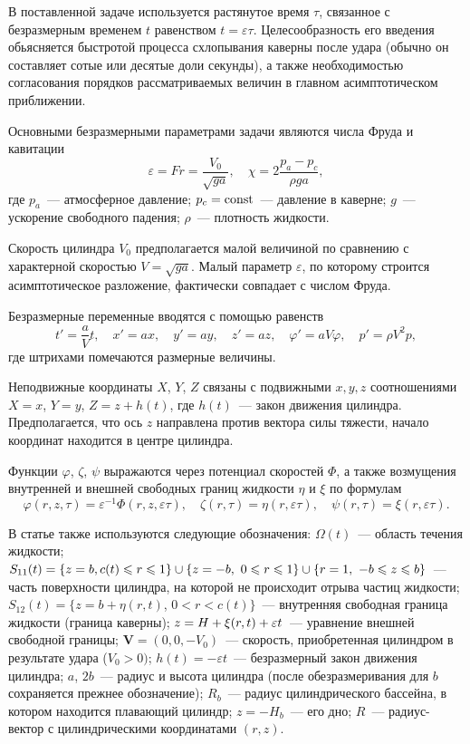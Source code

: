 \documentclass[press]{vestnik}
\begin{document}
В поставленной задаче используется растянутое время $\tau $, связанное с 
безразмерным временем $t$ равенством $t=\varepsilon \tau $. Целесообразность 
его введения обьясняется быстротой процесса схлопывания каверны после удара 
(обычно он составляет сотые или десятые доли секунды), а также 
необходимостью согласования порядков рассматриваемых величин в главном 
асимптотическом приближении. 

Основными безразмерными параметрами задачи являются числа Фруда и 
кавитации
\[
\varepsilon =Fr=\frac{V_{0} }{\sqrt {ga} },
\quad
\chi =2\frac{p_{a} -p_{c} }{\rho ga},
\]
где $p_{a} $~--- атмосферное давление; $p_{c} =\mathrm{const}$~--- давление в 
каверне; $g$~--- ускорение свободного падения; $\rho $~--- плотность жидкости. 

Скорость цилиндра $V_{0} $ предполагается малой величиной по сравнению с 
характерной скоростью $V=\sqrt {ga} $. Малый параметр $\varepsilon $, по 
которому строится асимптотическое разложение, фактически совпадает с числом 
Фруда.

Безразмерные переменные вводятся с помощью равенств
\[
{t}'=\frac{a}{V}t,
\quad
{x}'=ax,
\quad
{y}'=ay,
\quad
{z}'=az,
\quad
{\varphi }'=aV\varphi ,
\quad
{p}'=\rho V^{2}p,
\]
где штрихами помечаются размерные величины.

Неподвижные координаты $X$, $Y$, $Z$ связаны с подвижными $x,y,z$ соотношениями
$X=x$, $Y=y$, $Z=z+h(t)$, где $h(t)$~--- закон движения цилиндра. 
Предполагается, что ось $z$ направлена против вектора силы тяжести, начало 
координат находится в центре цилиндра. 

Функции $\varphi$, $\zeta$, $\psi $ выражаются через потенциал скоростей $\Phi $, а 
также возмущения внутренней и внешней свободных границ жидкости $\eta $ и 
$\xi $ по формулам
\[
\varphi (r,z,\tau )=\varepsilon^{-1}\Phi (r,z,\varepsilon \tau ),
\quad
\zeta (r,\tau )=\eta (r,\varepsilon \tau ),
\quad
\psi (r,\tau )=\xi (r,\varepsilon \tau ).
\]

В статье также используются следующие обозначения: $\Omega (t)$~--- область 
течения жидкости; $S_{11} (t)=\left\{ {z=b,c(t)\leqslant r\leqslant 1} \right\}\cup 
\left\{ {z=-b,\ 0\leqslant r\leqslant 1} \right\}\dm\cup \left\{ {r=1,\ -b\leqslant z\leqslant b} \right\}$~--- часть поверхности цилиндра, на которой не происходит отрыва частиц 
жидкости; $S_{12} (t)=\{ z=b+\eta (r,t)$, $0< r < c(t) \}$~--- 
внутренняя свободная граница жидкости (граница каверны); $z\dm=H+\xi 
(r,t)+\varepsilon t$~--- уравнение внешней свободной границы; $\bm V=(0, 0, -V_{0} )$~--- скорость, приобретенная цилиндром в результате 
удара ($V_{0} >0)$; $h(t)=-\varepsilon t$~--- безразмерный закон движения 
цилиндра; $a$, $2b$~--- радиус и высота цилиндра (после обезразмеривания для 
$b$ сохраняется прежнее обозначение); $R_{b} $~--- радиус цилиндрического 
бассейна, в котором находится плавающий цилиндр; $z=-H_{b} $~--- его дно; 
$R$~--- радиус-вектор с цилиндрическими координатами $(r,z)$.
\end{document}
